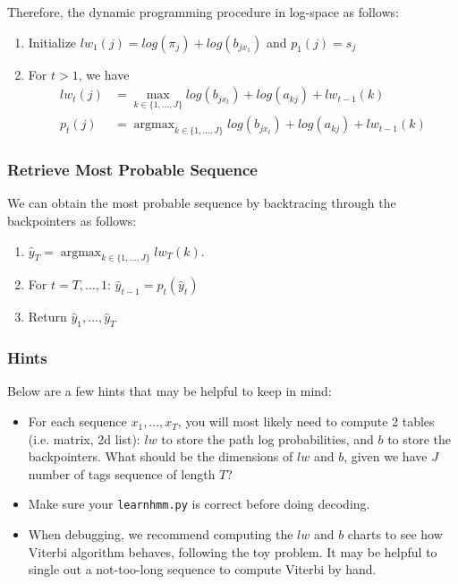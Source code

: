 \documentclass{article}
\newcommand{\argmax}{\mathop{\mathrm{argmax}}}
\begin{document}
Therefore, the dynamic programming procedure in log-space as follows: 
\begin{enumerate}
    \item Initialize $lw_1(j) = log(\pi_j) + log(b_{jx_1})$ and $p_1(j) = s_j$
    \item For $t > 1$, we have 
    \begin{align*}
        lw_t(j) &= \max_{k \in \{1,...,J\}} log(b_{jx_t}) + log(a_{kj}) + lw_{t-1}(k) \\ 
        p_t(j) &= \argmax_{k \in \{1,...,J\}} log(b_{jx_t}) + log(a_{kj}) + lw_{t-1}(k)
    \end{align*}
\end{enumerate}

\subsubsection{Retrieve Most Probable Sequence}
We can obtain the most probable sequence by backtracing through the backpointers as follows:
\begin{enumerate}
    \item $\hat{y}_T = \argmax_{k \in \{1,...,J\}} lw_T(k)$.
    \item For $t = T,...,1$: $\hat{y}_{t-1} = p_t(\hat{y}_t)$
    \item Return $\hat{y}_1, ..., \hat{y}_T$
\end{enumerate}

\subsubsection{Hints}
Below are a few hints that may be helpful to keep in mind:
\begin{itemize}
    \item For each sequence $x_1, ..., x_T$, you will most likely need to compute 2 tables (i.e. matrix, 2d list): $lw$ to store the path log probabilities, and $b$ to store the backpointers. What should be the dimensions of $lw$ and $b$, given we have $J$ number of tags sequence of length $T$?
    \item Make sure your \texttt{learnhmm.py} is correct before doing decoding. 
    \item When debugging, we recommend computing the $lw$ and $b$ charts to see how Viterbi algorithm behaves, following the toy problem. It may be helpful to single out a not-too-long sequence to compute Viterbi by hand.
\end{itemize}
\end{document}
